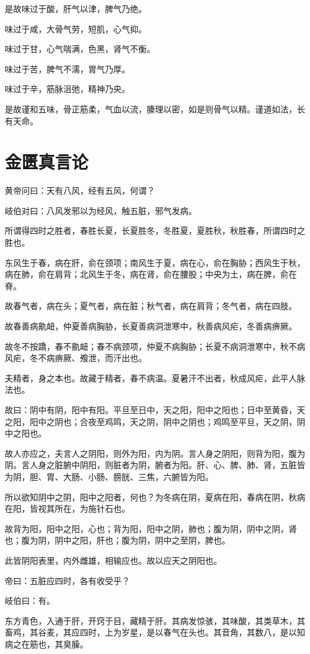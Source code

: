 \documentclass{article}%
\begin{document}
是故味过于酸，肝气以津，脾气乃绝。

味过于咸，大骨气劳，短肌，心气抑。

味过于甘，心气喘满，色黑，肾气不衡。

味过于苦，脾气不濡，胃气乃厚。

味过于辛，筋脉沮弛，精神乃央。

是故谨和五味，骨正筋柔，气血以流，腠理以密，如是则骨气以精。谨道如法，长有天命。
\section{金匮真言论}
黄帝问曰：天有八风，经有五风，何谓？

岐伯对曰：八风发邪以为经风，触五脏，邪气发病。

所谓得四时之胜者，春胜长夏，长夏胜冬，冬胜夏，夏胜秋，秋胜春，所谓四时之胜也。

东风生于春，病在肝，俞在颈项；南风生于夏，病在心，俞在胸胁；西风生于秋，病在肺，俞在肩背；北风生于冬，病在肾，俞在腰股；中央为土，病在脾，俞在脊。

故春气者，病在头；夏气者，病在脏；秋气者，病在肩背；冬气者，病在四肢。

故春善病鼽衄，仲夏善病胸胁，长夏善病洞泄寒中，秋善病风疟，冬善病痹厥。

故冬不按蹻，春不鼽衄；春不病颈项，仲夏不病胸胁；长夏不病洞泄寒中，秋不病风疟，冬不病痹厥、飧泄，而汗出也。

夫精者，身之本也。故藏于精者，春不病温。夏暑汗不出者，秋成风疟，此平人脉法也。

故曰：阴中有阴，阳中有阳。平旦至日中，天之阳，阳中之阳也；日中至黄昏，天之阳，阳中之阴也；合夜至鸡鸣，天之阴，阴中之阴也；鸡鸣至平旦，天之阴，阴中之阳也。

故人亦应之，夫言人之阴阳，则外为阳，内为阴。言人身之阴阳，则背为阳，腹为阴。言人身之脏腑中阴阳，则脏者为阴，腑者为阳。肝、心、脾、肺、肾，五脏皆为阴，胆、胃、大肠、小肠、膀胱、三焦，六腑皆为阳。

所以欲知阴中之阴，阳中之阳者，何也？为冬病在阴，夏病在阳，春病在阴，秋病在阳，皆视其所在，为施针石也。

故背为阳，阳中之阳，心也；背为阳，阳中之阴，肺也；腹为阴，阴中之阴，肾也；腹为阴，阴中之阳，肝也；腹为阴，阴中之至阴，脾也。

此皆阴阳表里，内外雌雄，相输应也。故以应天之阴阳也。

帝曰：五脏应四时，各有收受乎？

岐伯曰：有。

东方青色，入通于肝，开窍于目，藏精于肝。其病发惊骇，其味酸，其类草木，其畜鸡，其谷麦，其应四时，上为岁星，是以春气在头也。其音角，其数八，是以知病之在筋也，其臭臊。
\end{document}
